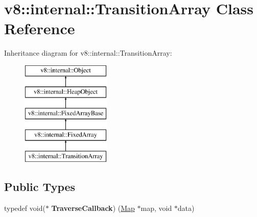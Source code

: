\hypertarget{classv8_1_1internal_1_1_transition_array}{}\section{v8\+:\+:internal\+:\+:Transition\+Array Class Reference}
\label{classv8_1_1internal_1_1_transition_array}
Inheritance diagram for v8\+:\+:internal\+:\+:Transition\+Array\+:\begin{figure}[H]
\begin{center}
\leavevmode
\includegraphics[height=5.000000cm]{classv8_1_1internal_1_1_transition_array}
\end{center}
\end{figure}
\subsection*{Public Types}
\begin{DoxyCompactItemize}
\item 
typedef void($\ast$ {\bfseries Traverse\+Callback}) (\hyperlink{classv8_1_1internal_1_1_map}{Map} $\ast$map, void $\ast$data)\hypertarget{classv8_1_1internal_1_1_transition_array_a09bd193fe748a3e5f80423428b4e22ef}{}\label{classv8_1_1internal_1_1_transition_array_a09bd193fe748a3e5f80423428b4e22ef}

\end{DoxyCompactItemize}

